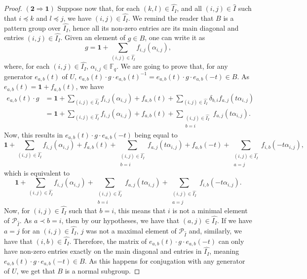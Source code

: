 \documentclass[11pt,letterpaper]{amsart}
\newcommand{\PP}{\mathcal{P}}
\newcommand{\FF}{\mathbb{F}}
\begin{document}
\begin{proof}
$\mathbf{(2\Rightarrow 1)}$
Suppose now that, for each $(k,l)\in \widehat{I_I}$, and all $(i,j)\in \widehat{I}$ such that $i\preccurlyeq k$ and $l\preccurlyeq j$, we have $(i,j)\in \widehat{I_I}$. We remind the reader that $B$ is a pattern group over $\widehat{I_I}$, hence all its non-zero entries are its main diagonal and entries $(i,j)\in \widehat{I_I}$.
Given an element of $g\in B$, one can write it as
$$g = \mathbf{1} + \sum_{(i,j)\in \widehat{I_I}} f_{i,j}(\alpha_{i,j}),$$
where, for each $(i,j)\in \widehat{I_I}$, $\alpha_{i,j}\in \FF_q$.
We are going to prove that, for any generator $e_{a,b}(t)$ of $U$, $e_{a,b}(t)\cdot g\cdot e_{a,b}(t)^{-1}=e_{a,b}(t)\cdot g\cdot e_{a,b}(-t)\in B$.
As $e_{a,b}(t) =\mathbf{1}+f_{a,b}(t)$, we have 
\begin{align*}e_{a,b}(t)\cdot g  &= \mathbf{1} + \sum_{(i,j)\in \widehat{I_I}} f_{i,j}(\alpha_{i,j})+ f_{a,b}(t) + \sum_{(i,j)\in \widehat{I_I}} \delta_{b,i}f_{a,j}(t\alpha_{i,j})\\
 &= \mathbf{1} + \sum_{(i,j)\in \widehat{I_I}} f_{i,j}(\alpha_{i,j})+ f_{a,b}(t) + \sum_{\substack{(i,j)\in \widehat{I_I}\\ b = i}} f_{a,j}(t\alpha_{i,j}).\end{align*}
Now, this results in $e_{a,b}(t)\cdot g\cdot e_{a,b}(-t)$ being equal to
$$\mathbf{1} + \sum_{(i,j)\in \widehat{I_I}} f_{i,j}(\alpha_{i,j})+ f_{a,b}(t) + \sum_{\substack{(i,j)\in \widehat{I_I}\\ b = i}} f_{a,j}(t\alpha_{i,j}) + f_{a,b}(-t) + \sum_{\substack{(i,j)\in \widehat{I_I}\\ a = j}} f_{i,b}(-t\alpha_{i,j}),$$
which is equivalent to
$$\mathbf{1} + \sum_{(i,j)\in \widehat{I_I}} f_{i,j}(\alpha_{i,j}) + \sum_{\substack{(i,j)\in \widehat{I_I}\\ b = i}} f_{a,j}(t\alpha_{i,j}) + \sum_{\substack{(i,j)\in \widehat{I_I}\\ a = j}} f_{i,b}(-t\alpha_{i,j}).$$
Now, for $(i,j)\in \widehat{I_I}$ such that $b=i$, this means that $i$ is not a minimal element of $\PP_{\widehat{I}}$. As $a \prec b = i$, then by our hypotheses, we have that $(a,j)\in \widehat{I_I}$. If we have $a = j$ for an $(i,j)\in \widehat{I_I}$, $j$ was not a maximal element of $\PP_{\widehat{I}}$ and, similarly, we have that $(i,b)\in\widehat{I_I}$.
Therefore, the matrix of $e_{a,b}(t)\cdot g\cdot e_{a,b}(-t)$ can only have non-zero entries exactly on the main diagonal and entries in $\widehat{I_I}$, meaning $e_{a,b}(t)\cdot g\cdot e_{a,b}(-t)\in B$.
As this happens for conjugation with any generator of $U$, we get that $B$ is a normal subgroup.
\end{proof}
\end{document}
